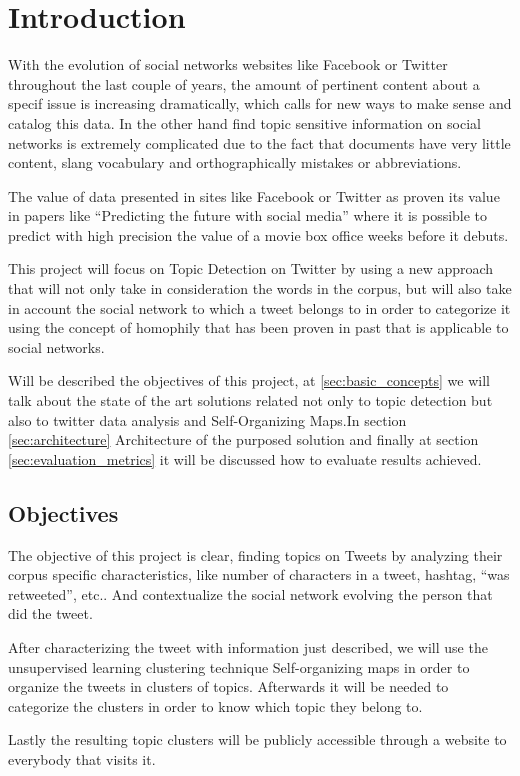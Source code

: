 
\section{Introduction}

With the evolution of social networks websites like Facebook or Twitter throughout the last couple of years, the amount of pertinent content about a specif issue is increasing dramatically, which calls for new ways to make sense and catalog this data.
In the other hand find topic sensitive information on social networks is extremely complicated due to the fact that documents have very little content, slang vocabulary and orthographically mistakes or abbreviations.

The value of data presented in sites like Facebook or Twitter as proven its value in papers like “Predicting the future with social media” where it is possible to predict with high precision the value of a movie box office weeks before it debuts.

This project will focus on Topic Detection on Twitter by using a new approach that will not only take in consideration the words in the corpus, but will also take in account the social network to which a tweet belongs to in order to categorize it using the concept of homophily that has been proven in past that is applicable to social networks.

Will be described the objectives of this project, at \ref{sec:basic_concepts} we will talk about the state of the art solutions related not only to topic detection but also to twitter data analysis and Self-Organizing Maps.In section \ref{sec:architecture} Architecture of the purposed solution and finally at section \ref{sec:evaluation_metrics} it will be discussed how to evaluate results achieved.

\subsection{Objectives} %
\label{sub:objectives}

The objective of this project is clear, finding topics on Tweets by analyzing their corpus specific characteristics, like number of characters in a tweet, hashtag, “was retweeted”, etc.. And contextualize the social network evolving the person that did the tweet.

After characterizing the tweet with information just described, we will use the unsupervised learning clustering technique Self-organizing maps in order to organize the tweets in clusters of topics. Afterwards it will be needed to categorize the clusters in order to know which topic they belong to.

Lastly the resulting topic clusters will be publicly accessible through a website to everybody that visits it.

